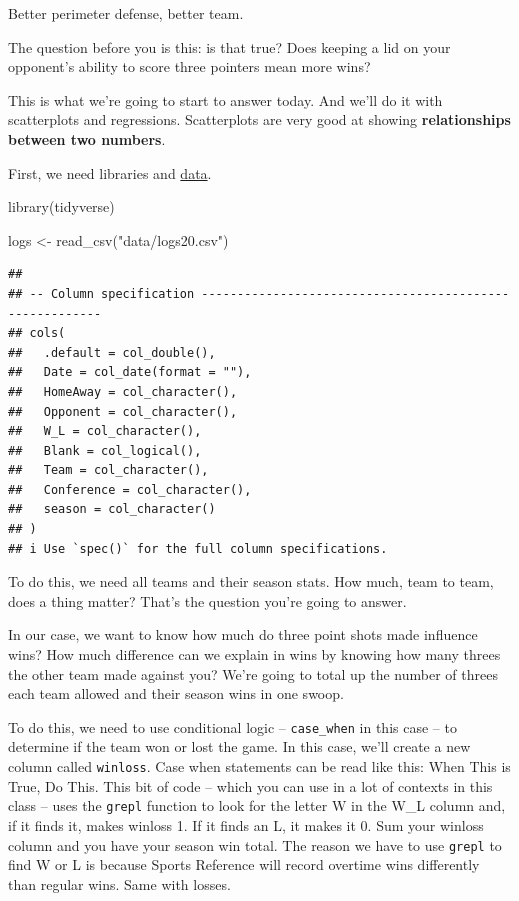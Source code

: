\documentclass[
]{book}
\newenvironment{Shaded}{\begin{snugshade}}{\end{snugshade}}
\newcommand{\FunctionTok}[1]{\textcolor[rgb]{0.00,0.00,0.00}{#1}}
\newcommand{\NormalTok}[1]{#1}
\newcommand{\OtherTok}[1]{\textcolor[rgb]{0.56,0.35,0.01}{#1}}
\newcommand{\StringTok}[1]{\textcolor[rgb]{0.31,0.60,0.02}{#1}}
\begin{document}
Better perimeter defense, better team.

The question before you is this: is that true? Does keeping a lid on your opponent's ability to score three pointers mean more wins?

This is what we're going to start to answer today. And we'll do it with scatterplots and regressions. Scatterplots are very good at showing \textbf{relationships between two numbers}.

First, we need libraries and \href{https://unl.box.com/s/yc01x7ae7r2jtuixo4j3s3s0ed7o5f8g}{data}.

\begin{Shaded}
\begin{Highlighting}[]
\FunctionTok{library}\NormalTok{(tidyverse)}
\end{Highlighting}
\end{Shaded}

\begin{Shaded}
\begin{Highlighting}[]
\NormalTok{logs }\OtherTok{\textless{}{-}} \FunctionTok{read\_csv}\NormalTok{(}\StringTok{"data/logs20.csv"}\NormalTok{)}
\end{Highlighting}
\end{Shaded}

\begin{verbatim}
## 
## -- Column specification --------------------------------------------------------
## cols(
##   .default = col_double(),
##   Date = col_date(format = ""),
##   HomeAway = col_character(),
##   Opponent = col_character(),
##   W_L = col_character(),
##   Blank = col_logical(),
##   Team = col_character(),
##   Conference = col_character(),
##   season = col_character()
## )
## i Use `spec()` for the full column specifications.
\end{verbatim}

To do this, we need all teams and their season stats. How much, team to team, does a thing matter? That's the question you're going to answer.

In our case, we want to know how much do three point shots made influence wins? How much difference can we explain in wins by knowing how many threes the other team made against you? We're going to total up the number of threes each team allowed and their season wins in one swoop.

To do this, we need to use conditional logic -- \texttt{case\_when} in this case -- to determine if the team won or lost the game. In this case, we'll create a new column called \texttt{winloss}. Case when statements can be read like this: When This is True, Do This. This bit of code -- which you can use in a lot of contexts in this class -- uses the \texttt{grepl} function to look for the letter W in the W\_L column and, if it finds it, makes winloss 1. If it finds an L, it makes it 0. Sum your winloss column and you have your season win total. The reason we have to use \texttt{grepl} to find W or L is because Sports Reference will record overtime wins differently than regular wins. Same with losses.
\end{document}

